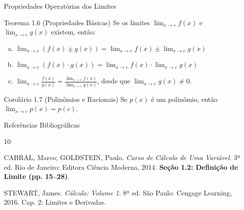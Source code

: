 \documentclass[10pt,aspectratio=169]{beamer}
\begin{document}
\begin{frame}{Propriedades Operatórias dos Limites}
    \transfade
    \begin{block}{Teorema 1.6 (Propriedades Básicas)}
        Se os limites $\lim_{x \to c} f(x)$ e $\lim_{x \to c} g(x)$ existem, então:
        \begin{enumerate}[(a)]
            \item $\lim_{x \to c} (f(x) \pm g(x)) = \lim_{x \to c} f(x) \pm \lim_{x \to c} g(x)$
            \item $\lim_{x \to c} (f(x) \cdot g(x)) = \lim_{x \to c} f(x) \cdot \lim_{x \to c} g(x)$
            \item $\lim_{x \to c} \frac{f(x)}{g(x)} = \frac{\lim_{x \to c} f(x)}{\lim_{x \to c} g(x)}$, desde que $\lim_{x \to c} g(x) \neq 0$.
        \end{enumerate}
    \end{block}

    \vspace{0.2cm}\pause
    \begin{alertblock}{Corolário 1.7 (Polinômios e Racionais)}
        Se $p(x)$ é um polinômio, então $\lim_{x \to c} p(x) = p(c)$.
    \end{alertblock}
\end{frame}

\begin{frame}{Referências Bibliográficas}
    \transblindshorizontal
    \begin{thebibliography}{10}
        
        CABRAL, Marco; GOLDSTEIN, Paulo.
        \newblock \emph{Curso de Cálculo de Uma Variável}.
        \newblock 3ª ed. Rio de Janeiro: Editora Ciência Moderna, 2014.
        \newblock \textbf{Seção 1.2: Definição de Limite (pp. 15--28)}.
        
        \vspace{0.4cm}
        
        STEWART, James.
        \newblock \emph{Cálculo: Volume 1}.
        \newblock 8ª ed. São Paulo: Cengage Learning, 2016.
        \newblock Cap. 2: Limites e Derivadas.

    \end{thebibliography}
\end{frame}
\end{document}
